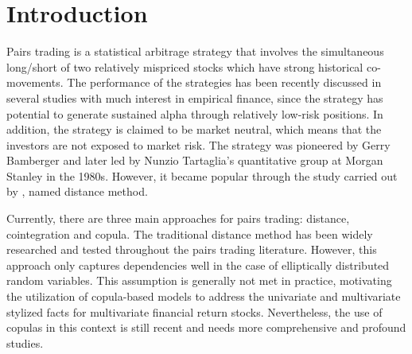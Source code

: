 \documentclass[a4paper]{article}
\begin{document}
	
	
	
	\section{Introduction}

	Pairs trading is a statistical arbitrage strategy that involves the simultaneous long/short of two relatively mispriced stocks which have strong historical co-movements. The performance of the strategies has been recently discussed in several studies with much interest in empirical finance, since the strategy has potential to generate sustained alpha through relatively low-risk positions. In addition, the strategy is claimed to be market neutral, which means that the investors are not exposed to market risk. The strategy was pioneered by Gerry Bamberger and later led by Nunzio Tartaglia's quantitative group at Morgan Stanley in the 1980s. However, it became popular through the study carried out by \citet*{ggr06}, named distance method.
	
	Currently, there are three main approaches for pairs trading: distance, cointegration and copula. The traditional distance method has been widely researched and tested throughout the pairs trading literature. However, this approach only captures dependencies well in the case of elliptically distributed random variables. This assumption is generally not met in practice, motivating the utilization of copula-based models to address the univariate and multivariate stylized facts for multivariate financial return stocks. Nevertheless, the use of copulas in this context is still recent and needs more comprehensive and profound studies.
	
\end{document}
